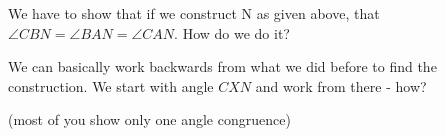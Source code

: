 







We have to show that if we construct N as given above, that $\angle CBN = \angle BAN = \angle CAN$. How do we do it?



We can basically work backwards from what we did before to find the construction. We start with angle $CXN $ and work from there - how?

(most of you show only one angle congruence)





